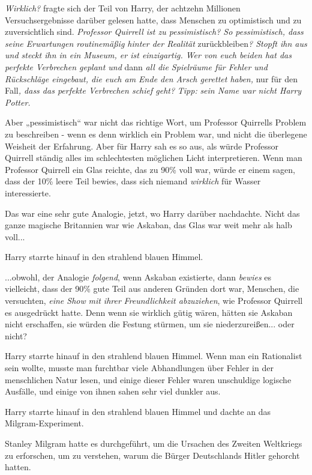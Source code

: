 {\emph{Wirklich?} fragte sich der Teil von Harry, der achtzehn Millionen Versuchsergebnisse darüber gelesen hatte, dass Menschen zu optimistisch und zu zuversichtlich sind. \emph{Professor Quirrell ist zu pessimistisch? So pessimistisch, dass seine Erwartungen routinemäßig hinter der Realität} zurückbleiben\emph{? Stopft ihn aus und steckt ihn in ein Museum, er ist einzigartig. Wer von euch beiden hat das perfekte Verbrechen geplant und} dann \emph{all die Spielräume für Fehler und Rückschläge eingebaut, die euch am Ende den Arsch gerettet haben,} nur für den Fall\emph{, dass das perfekte Verbrechen schief geht?} \emph{Tipp:} \emph{sein Name war nicht Harry Potter.}

Aber „pessimistisch“ war nicht das richtige Wort, um Professor Quirrells Problem zu beschreiben - wenn es denn wirklich ein Problem war, und nicht die überlegene Weisheit der Erfahrung. Aber für Harry sah es so aus, als würde Professor Quirrell ständig alles im schlechtesten möglichen Licht interpretieren. Wenn man Professor Quirrell ein Glas reichte, das zu 90\% voll war, würde er einem sagen, dass der 10\% leere Teil bewies, dass sich niemand \emph{wirklich} für Wasser interessierte.

Das war eine sehr gute Analogie, jetzt, wo Harry darüber nachdachte. Nicht das ganze magische Britannien war wie Askaban, das Glas war weit mehr als halb voll...

Harry starrte hinauf in den strahlend blauen Himmel.

...obwohl, der Analogie \emph{folgend}, wenn Askaban existierte, dann \emph{bewies} es vielleicht, dass der 90\% gute Teil aus anderen Gründen dort war, Menschen, die versuchten, \emph{eine Show} \emph{mit ihrer} \emph{Freundlichkeit abzuziehen}, wie Professor Quirrell es ausgedrückt hatte. Denn wenn sie wirklich gütig wären, hätten sie Askaban nicht erschaffen, sie würden die Festung stürmen, um sie niederzureißen... oder nicht?

Harry starrte hinauf in den strahlend blauen Himmel. Wenn man ein Rationalist sein wollte, musste man furchtbar viele Abhandlungen über Fehler in der menschlichen Natur lesen, und einige dieser Fehler waren unschuldige logische Ausfälle, und einige von ihnen sahen sehr viel dunkler aus.

Harry starrte hinauf in den strahlend blauen Himmel und dachte an das Milgram-Experiment.

Stanley Milgram hatte es durchgeführt, um die Ursachen des Zweiten Weltkriegs zu erforschen, um zu verstehen, warum die Bürger Deutschlands Hitler gehorcht hatten.

}
